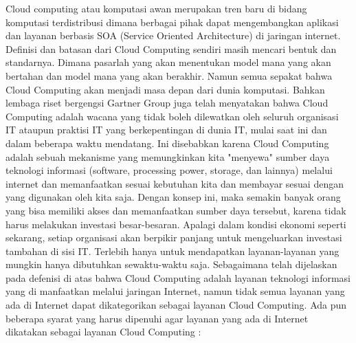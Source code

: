 \tab Cloud computing atau komputasi awan merupakan tren baru di bidang komputasi terdistribusi dimana berbagai pihak dapat mengembangkan aplikasi dan layanan berbasis SOA (Service Oriented Architecture) di jaringan internet. Definisi dan batasan dari Cloud Computing sendiri masih mencari bentuk dan standarnya. Dimana pasarlah yang akan menentukan model mana yang akan bertahan dan model mana yang akan berakhir. Namun semua sepakat bahwa Cloud Computing akan menjadi masa depan dari dunia komputasi. Bahkan lembaga riset bergengsi Gartner Group juga telah menyatakan bahwa Cloud Computing adalah wacana yang tidak boleh dilewatkan oleh seluruh organisasi IT ataupun praktisi IT yang berkepentingan di dunia IT, mulai saat ini dan dalam beberapa waktu mendatang. Ini disebabkan karena Cloud Computing adalah sebuah mekanisme yang memungkinkan kita "menyewa" sumber daya teknologi informasi (software, processing power, storage, dan lainnya) melalui internet dan memanfaatkan sesuai kebutuhan kita dan membayar sesuai dengan yang digunakan oleh kita saja.
\tab Dengan konsep ini, maka semakin banyak orang yang bisa memiliki akses dan memanfaatkan sumber daya tersebut, karena tidak harus melakukan investasi besar-besaran. Apalagi dalam kondisi ekonomi seperti sekarang, setiap organisasi akan berpikir panjang untuk mengeluarkan investasi tambahan di sisi IT. Terlebih hanya untuk mendapatkan layanan-layanan yang mungkin hanya dibutuhkan sewaktu-waktu saja. Sebagaimana telah dijelaskan pada defenisi di atas bahwa Cloud Computing adalah layanan teknologi informasi yang di manfaatkan melalui jaringan Internet, namun tidak semua layanan yang ada di Internet dapat dikategorikan sebagai layanan Cloud Computing. Ada pun beberapa syarat yang harus dipenuhi agar layanan yang ada di Internet dikatakan sebagai layanan Cloud Computing :
